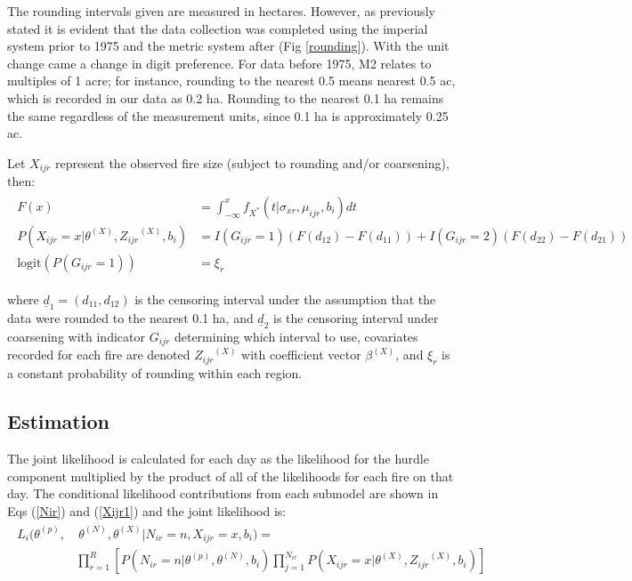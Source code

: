 \documentclass[10pt,letterpaper]{article}
\begin{document}
The rounding intervals given are measured in hectares. However, as previously stated it is evident that the data collection was completed using the imperial system
prior to 1975 and the metric system after (Fig \ref{rounding}). With
the unit change came a change in digit preference. For data before 1975,
M2 relates to multiples of 1 acre; for instance, rounding to the
nearest 0.5 means nearest 0.5 ac, which is recorded in our data as
0.2 ha. Rounding to the nearest 0.1 ha remains the same regardless of the measurement units, since 0.1 ha is
approximately 0.25 ac.

Let \(X_{ijr}\) represent the observed fire size (subject to rounding
and/or coarsening), then: \begin{align}
\begin{split}
F(x) &= \int_{-\infty}^x f_{X^*}(t|\sigma_{xr}, \mu_{ijr}, b_i)dt\\
P(X_{ijr} = x|\theta^{(X)}, {Z_{ijr}}^{(X)}, b_i) &= I(G_{ijr}=1)(F(d_{12}) - F(d_{11})) + I(G_{ijr} = 2)(F(d_{22}) - F(d_{21}))\\
\text{logit}(P(G_{ijr} = 1)) &= \xi_r
\end{split}
\end{align}

\noindent where \(\underline d_1 = (d_{11}, d_{12})\) is the censoring interval
under the assumption that the data were rounded to the nearest 0.1 ha,
and \(\underline d_2\) is the censoring interval under coarsening with
indicator \(G_{ijr}\) determining which interval to use, covariates
recorded for each fire are denoted \({Z_{ijr}}^{(X)}\) with coefficient
vector \(\beta^{(X)}\), and $\xi_r$ is a constant probability of rounding within each region.

\hypertarget{estimation}{%
\subsection{Estimation}\label{estimation}}

The joint likelihood is calculated for each day as the likelihood for
the hurdle component multiplied by the product of all of the likelihoods
for each fire on that day. The conditional likelihood contributions from
each submodel are shown in Eqs (\ref{Nir}) and (\ref{Xijr1}) and
the joint likelihood is: \begin{align}\begin{split}
L_i(\theta^{(p)}, &~ \theta^{(N)}, \theta^{(X)} | N_{ir}=n, X_{ijr} = x, b_i) =\\& \prod_{r = 1}^R\left[P(N_{ir} = n|\theta^{(p)}, \theta^{(N)}, b_i)\prod_{j = 1}^{N_{ir}}P(X_{ijr} = x|\theta^{(X)}, {Z_{ijr}}^{(X)}, b_i)\right]
\label{bigLik}\end{split}\end{align}
\end{document}
